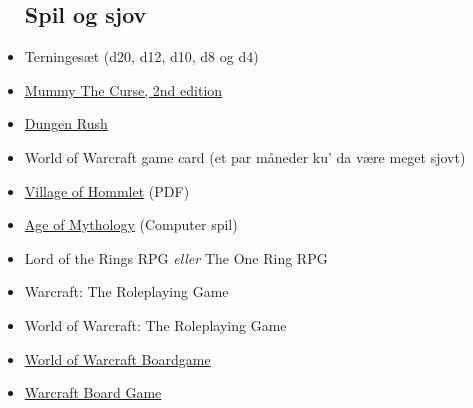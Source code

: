 \documentclass{article}
\begin{document}
\begin{itemize}
\subsection{Spil og sjov}
    \item Terningesæt (d20, d12, d10, d8 og d4)
    \item \href{https://www.kickstarter.com/projects/339646881/mummy-the-curse-2nd-edition}{Mummy The Curse, 2nd edition}
    \item \href{https://boardgamegeek.com/boardgame/207338/dungeon-rush}{Dungen Rush}
    \item World of Warcraft game card (et par måneder ku' da være meget sjovt)
    \item \href{https://www.dmsguild.com/product/17067/T1-The-Village-of-Hommlet-1e}{Village of Hommlet} (PDF)
    \item \href{https://store.steampowered.com/app/266840/Age_of_Mythology_Extended_Edition/}{Age of Mythology} (Computer spil)
    \item Lord of the Rings RPG \textit{eller} The One Ring RPG
    \item Warcraft: The Roleplaying Game
    \item World of Warcraft: The Roleplaying Game
    \item \href{https://boardgamegeek.com/boardgame/17223/world-warcraft-boardgame}{World of Warcraft Boardgame}
    \item \href{https://boardgamegeek.com/boardgame/7479/warcraft-board-game}{Warcraft Board Game}
\end{itemize}
\end{document}
